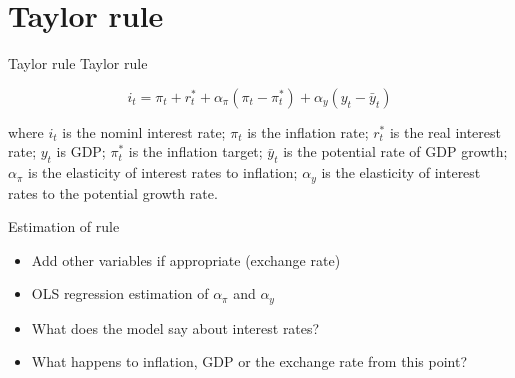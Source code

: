 \documentclass[14pt,xcolor=pdftex,dvipsnames,table]{beamer}\usepackage[]{graphicx}\usepackage[]{color}
\begin{document}
\section{Taylor rule}
\begin{frame}{Taylor rule}
Taylor rule 
\begin{block}{}
\begin{equation*}
i_t = \pi_t + r_t^* + \alpha_{\pi}(\pi_t - \pi_t^*) + \alpha_y(y_t - \bar{y}_t)
\end{equation*}
\end{block}
where $i_t$ is the nominl interest rate; $\pi_t$ is the inflation rate; $r_t^*$ is the real interest rate; $y_t$ is GDP; $\pi_t^*$ is the inflation target; $\bar{y}_t$ is the potential rate of GDP growth; $\alpha_{\pi}$ is the elasticity of interest rates to inflation; $\alpha_y$ is the elasticity of interest rates to the potential growth rate.  
\end{frame}

\begin{frame}{Estimation of rule}
\begin{itemize}[<+-| alert@+>]
\item Add other variables if appropriate (exchange rate)
\item OLS regression estimation of $\alpha_{\pi}$ and $\alpha_y$
\item What does the model say about interest rates?
\item What happens to inflation, GDP or the exchange rate from this point? 
\end{itemize}
\end{frame}



\end{document}
